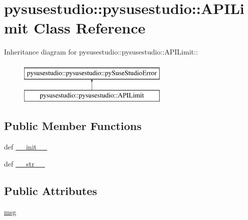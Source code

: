 \hypertarget{classpysusestudio_1_1pysusestudio_1_1_a_p_i_limit}{
\section{pysusestudio::pysusestudio::APILimit Class Reference}
\label{classpysusestudio_1_1pysusestudio_1_1_a_p_i_limit}
}
Inheritance diagram for pysusestudio::pysusestudio::APILimit::\begin{figure}[H]
\begin{center}
\leavevmode
\includegraphics[height=2cm]{classpysusestudio_1_1pysusestudio_1_1_a_p_i_limit}
\end{center}
\end{figure}
\subsection*{Public Member Functions}
\begin{DoxyCompactItemize}
\item 
def \hyperlink{classpysusestudio_1_1pysusestudio_1_1_a_p_i_limit_a27e923705519ee58d3eb37d930045e49}{\_\-\_\-init\_\-\_\-}
\item 
def \hyperlink{classpysusestudio_1_1pysusestudio_1_1_a_p_i_limit_a1276e9098dc88e6f270eb66149a219fa}{\_\-\_\-str\_\-\_\-}
\end{DoxyCompactItemize}
\subsection*{Public Attributes}
\begin{DoxyCompactItemize}
\item 
\hyperlink{classpysusestudio_1_1pysusestudio_1_1_a_p_i_limit_a0b841d2d35e949aafd2d2b2c7eb35bee}{msg}
\end{DoxyCompactItemize}


